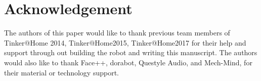 \documentclass[runningheads,a4paper]{llncs}
\begin{document}


\section*{Acknowledgement}
The authors of this paper would like to thank previous team members of Tinker@Home 2014, Tinker@Home2015, Tinker@Home2017 for their help and support through out building the robot and writing this manuscript. The authors would also like to thank Face++, dorabot, Questyle Audio, and Mech-Mind, for their material or technology support. 




\end{document}
